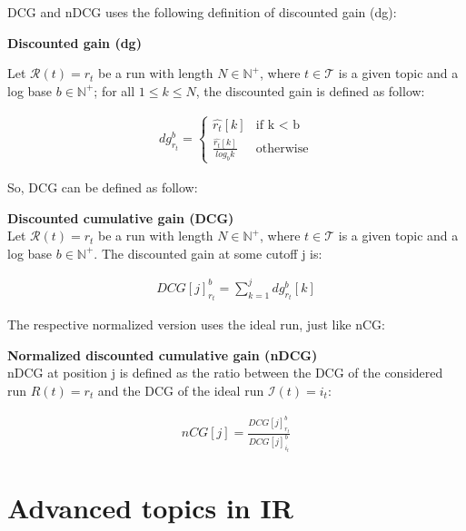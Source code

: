 DCG and nDCG uses the following definition of discounted gain (dg):

\begin{definition}{\textbf{Discounted gain (dg)}}

Let $\mathcal{R}(t) = r_t$ be a run with length $N \in \mathbb{N}^+$, where $t \in \mathcal{T}$ is a given topic and a log base $b \in \mathbb{N}^+$; for all $1 \leq k \leq N$, the discounted gain is defined as follow:

\begin{align*}
dg_{r_t}^b = \begin{cases}
\hat{r_t}[k] & \text{if k < b}\\
\frac {\hat{r_t}[k]}{log_b k} &\text{otherwise}
\end{cases}
\end{align*}

\end{definition}

So, DCG can be defined as follow:

\begin{definition}{\textbf{Discounted cumulative gain (DCG)}}\\

Let $\mathcal{R}(t) = r_t$ be a run with length $N \in \mathbb{N}^+$, where $t \in \mathcal{T}$ is a given topic and a log base $b \in \mathbb{N}^+$.
The discounted gain at some cutoff j is:

\begin{align*}
DCG[j]_{r_t}^b = \sum_{k=1}^j dg_{r_t}^b [k]
\end{align*}

\end{definition}

The respective normalized version uses the ideal run, just like nCG:

\begin{definition}{\textbf{Normalized discounted cumulative gain (nDCG)}}\\

nDCG at position j is defined as the ratio between the DCG of the considered run $R(t)=r_t$ and the DCG of the ideal run $\mathcal{I}(t)=i_t$:

\begin{align*}
nCG[j] = \frac{DCG[j]_{r_t}^b}{DCG[j]_{i_t}^b}
\end{align*}

\end{definition}

\section{Advanced topics in IR}

